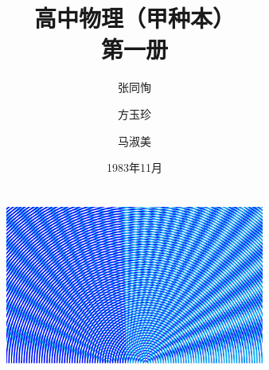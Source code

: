 \documentclass{retypeset}
\begin{document}
	
	
	
	\title{\Huge\bfseries 高中物理（甲种本）\\ 第一册 \vspace*{2cm} }
	\author{\Large 张同恂 \and \Large 方玉珍 \and \Large 马淑美}
	\date{\Large 1983年11月\\~\\~\\ \includegraphics[width=85mm]{fig/A/cover.pdf} }
	
	
	
	
	
\end{document}
